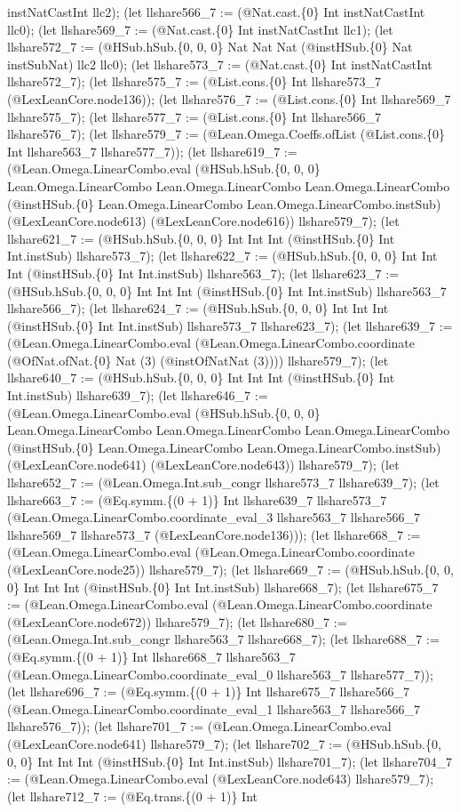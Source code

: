 \documentclass[11pt]{article}
\begin{document}
instNatCastInt llc2); (let llshare566\_7 := (@Nat.cast.\{0\} Int instNatCastInt llc0); (let llshare569\_7 := (@Nat.cast.\{0\} Int instNatCastInt llc1); (let llshare572\_7 := (@HSub.hSub.\{0, 0, 0\} Nat Nat Nat (@instHSub.\{0\} Nat instSubNat) llc2 llc0); (let llshare573\_7 := (@Nat.cast.\{0\} Int instNatCastInt llshare572\_7); (let llshare575\_7 := (@List.cons.\{0\} Int llshare573\_7 (@LexLeanCore.node136)); (let llshare576\_7 := (@List.cons.\{0\} Int llshare569\_7 llshare575\_7); (let llshare577\_7 := (@List.cons.\{0\} Int llshare566\_7 llshare576\_7); (let llshare579\_7 := (@Lean.Omega.Coeffs.ofList (@List.cons.\{0\} Int llshare563\_7 llshare577\_7)); (let llshare619\_7 := (@Lean.Omega.LinearCombo.eval (@HSub.hSub.\{0, 0, 0\} Lean.Omega.LinearCombo Lean.Omega.LinearCombo Lean.Omega.LinearCombo (@instHSub.\{0\} Lean.Omega.LinearCombo Lean.Omega.LinearCombo.instSub) (@LexLeanCore.node613) (@LexLeanCore.node616)) llshare579\_7); (let llshare621\_7 := (@HSub.hSub.\{0, 0, 0\} Int Int Int (@instHSub.\{0\} Int Int.instSub) llshare573\_7); (let llshare622\_7 := (@HSub.hSub.\{0, 0, 0\} Int Int Int (@instHSub.\{0\} Int Int.instSub) llshare563\_7); (let llshare623\_7 := (@HSub.hSub.\{0, 0, 0\} Int Int Int (@instHSub.\{0\} Int Int.instSub) llshare563\_7 llshare566\_7); (let llshare624\_7 := (@HSub.hSub.\{0, 0, 0\} Int Int Int (@instHSub.\{0\} Int Int.instSub) llshare573\_7 llshare623\_7); (let llshare639\_7 := (@Lean.Omega.LinearCombo.eval (@Lean.Omega.LinearCombo.coordinate (@OfNat.ofNat.\{0\} Nat (3) (@instOfNatNat (3)))) llshare579\_7); (let llshare640\_7 := (@HSub.hSub.\{0, 0, 0\} Int Int Int (@instHSub.\{0\} Int Int.instSub) llshare639\_7); (let llshare646\_7 := (@Lean.Omega.LinearCombo.eval (@HSub.hSub.\{0, 0, 0\} Lean.Omega.LinearCombo Lean.Omega.LinearCombo Lean.Omega.LinearCombo (@instHSub.\{0\} Lean.Omega.LinearCombo Lean.Omega.LinearCombo.instSub) (@LexLeanCore.node641) (@LexLeanCore.node643)) llshare579\_7); (let llshare652\_7 := (@Lean.Omega.Int.sub\_congr llshare573\_7 llshare639\_7); (let llshare663\_7 := (@Eq.symm.\{(0 + 1)\} Int llshare639\_7 llshare573\_7 (@Lean.Omega.LinearCombo.coordinate\_eval\_3 llshare563\_7 llshare566\_7 llshare569\_7 llshare573\_7 (@LexLeanCore.node136))); (let llshare668\_7 := (@Lean.Omega.LinearCombo.eval (@Lean.Omega.LinearCombo.coordinate (@LexLeanCore.node25)) llshare579\_7); (let llshare669\_7 := (@HSub.hSub.\{0, 0, 0\} Int Int Int (@instHSub.\{0\} Int Int.instSub) llshare668\_7); (let llshare675\_7 := (@Lean.Omega.LinearCombo.eval (@Lean.Omega.LinearCombo.coordinate (@LexLeanCore.node672)) llshare579\_7); (let llshare680\_7 := (@Lean.Omega.Int.sub\_congr llshare563\_7 llshare668\_7); (let llshare688\_7 := (@Eq.symm.\{(0 + 1)\} Int llshare668\_7 llshare563\_7 (@Lean.Omega.LinearCombo.coordinate\_eval\_0 llshare563\_7 llshare577\_7)); (let llshare696\_7 := (@Eq.symm.\{(0 + 1)\} Int llshare675\_7 llshare566\_7 (@Lean.Omega.LinearCombo.coordinate\_eval\_1 llshare563\_7 llshare566\_7 llshare576\_7)); (let llshare701\_7 := (@Lean.Omega.LinearCombo.eval (@LexLeanCore.node641) llshare579\_7); (let llshare702\_7 := (@HSub.hSub.\{0, 0, 0\} Int Int Int (@instHSub.\{0\} Int Int.instSub) llshare701\_7); (let llshare704\_7 := (@Lean.Omega.LinearCombo.eval (@LexLeanCore.node643) llshare579\_7); (let llshare712\_7 := (@Eq.trans.\{(0 + 1)\} Int 
\end{document}
